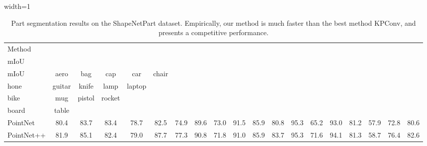 \documentclass{article} \usepackage{iclr2022_conference,times}
\begin{document}
\begin{table*}[]
    \centering
    \caption{Part segmentation results on the ShapeNetPart dataset. Empirically, our method is much faster than the best method KPConv, and presents a competitive performance.}
    \label{tab:part_segmentation}
    \vspace{1mm}
    \begin{adjustbox}{width=1\textwidth}
    \begin{tabular}{l|cc|cccccccccccccccc}
        \toprule 
         Method& \makecell{ Cls.\\mIoU}& \makecell{ Inst.\\mIoU}&aero &bag &cap &car &chair &\makecell{ aerp-\\hone} &guitar &knife &lamp &laptop &\makecell{ motor-\\bike} &mug &pistol &rocket  &\makecell{ skate-\\board} & table \\
         \midrule
         PointNet&80.4&83.7 &83.4 &78.7 &82.5 &74.9 &89.6 &73.0 &91.5 &85.9 &80.8 &95.3 &65.2 &93.0 &81.2 &57.9 &72.8 &80.6 \\
         
         PointNet++&81.9&85.1 &82.4 &79.0 &87.7 &77.3 &90.8 &71.8 &91.0 &85.9 &83.7 &95.3 &71.6 &94.1 &81.3 &58.7 &76.4  &82.6 \\
         

\end{tabular}
\end{adjustbox}
\end{table*}
\end{document}
